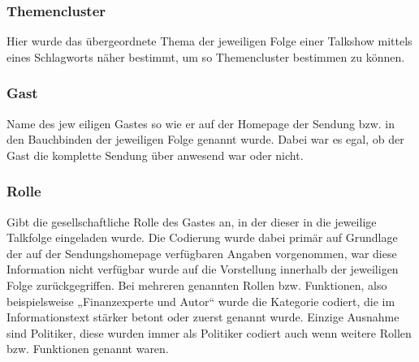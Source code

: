 {\subsubsection{Themencluster}

Hier wurde das übergeordnete Thema der jeweiligen Folge einer Talkshow mittels eines Schlagworts näher bestimmt, um so Themencluster bestimmen zu können.

\subsubsection{Gast}

Name des jew
eiligen Gastes so wie er auf der Homepage der Sendung bzw. in den Bauchbinden der jeweiligen Folge genannt wurde. Dabei war es egal, ob der Gast die komplette Sendung über anwesend war oder nicht.

\subsubsection{Rolle}

Gibt die gesellschaftliche Rolle des Gastes an, in der dieser in die jeweilige Talkfolge eingeladen wurde. Die Codierung wurde dabei primär auf Grundlage der auf der Sendungshomepage verfügbaren Angaben vorgenommen, war diese Information nicht verfügbar wurde auf die Vorstellung innerhalb der jeweiligen Folge zurückgegriffen. Bei mehreren genannten Rollen bzw. Funktionen, also beispielsweise „Finanzexperte und Autor“ wurde die Kategorie codiert, die im Informationstext stärker betont oder zuerst genannt wurde. Einzige Ausnahme sind Politiker, diese wurden immer als Politiker codiert auch wenn weitere Rollen bzw. Funktionen genannt waren.

}
